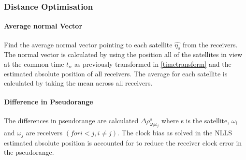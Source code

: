 \documentclass[11pt,a4paper]{article}
\begin{document}
\subsubsection{Distance Optimisation}
\paragraph{Average normal Vector}
Find the average normal vector pointing to each satellite $\hat{\eta_s}$ from the receivers. The normal vector is calculated by using the position all of the satellites in view at the common time $t_{\alpha}$ as previously transformed in \ref{timetransform} and the estimated absolute position of all receivers. The average for each satellite is calculated by taking the mean across all receivers.

\paragraph{Difference in Pseudorange}
The differences in pseudorange are calculated $\Delta\rho^s_{\omega_i\omega_j}$ where s is the satellite, $\omega_i$ and $\omega_j$ are receivers $(for i<j, i\neq j)$. The clock bias as solved in the NLLS estimated absolute position is accounted for to reduce the receiver clock error in the pseudorange.
\end{document}
